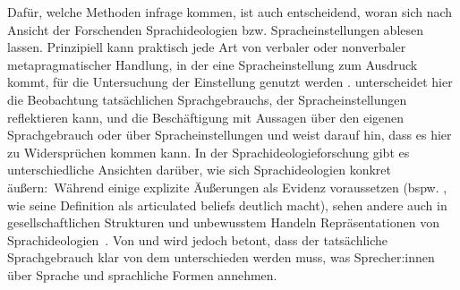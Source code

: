 Dafür, welche Methoden infrage kommen, ist auch entscheidend, woran sich nach Ansicht der Forschenden Sprachideologien bzw. Spracheinstellungen ablesen lassen. 
Prinzipiell kann praktisch jede Art von verbaler oder nonverbaler metapragmatischer Handlung, in der eine Sprach\-ein\-stel\-lung zum Ausdruck kommt, für die Untersuchung der Einstellung genutzt werden \citep[s.][242]{Ajzen1989}. 
\citet[1320--1321]{Vandermeeren2005} unterscheidet hier die Beobachtung tatsächlichen Sprachgebrauchs, der Sprach\-ein\-stel\-lungen reflektieren kann, und die Beschäftigung mit Aussagen über den eigenen Sprachgebrauch oder über Spracheinstellungen und weist darauf hin, dass es hier zu Widersprüchen kommen kann. 
In der Sprachideologieforschung gibt es unterschiedliche Ansichten darüber, wie sich Sprachideologien konkret äußern:~W{\"a}hrend einige explizite {\"A}u{\ss}erungen als Evidenz voraussetzen (bspw. \citealp{Silverstein1979}, wie seine Definition als \glqq articulated beliefs\grqq{} deutlich macht), sehen andere auch in gesellschaftlichen Strukturen und unbewusstem Handeln Repr{\"a}sentationen von Sprachideologien~\citep[s.][57--58]{Woolard1994}. 
Von \citet[52]{Irvine1998} und \citet[43]{Silverstein.1976} wird jedoch betont, dass der tatsächliche Sprachgebrauch klar von dem unterschieden werden muss, was Sprecher:innen {\"u}ber Sprache und sprachliche Formen annehmen. 

